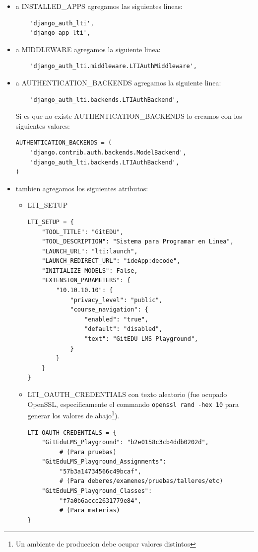 \begin{itemize}
	\item a INSTALLED\_APPS agregamos las siguientes lineas:
   		\begin{lstlisting}
    'django_auth_lti',
    'django_app_lti',
    	\end{lstlisting}
    \item a MIDDLEWARE agregamos la siguiente linea:
   		\begin{lstlisting}
    'django_auth_lti.middleware.LTIAuthMiddleware',
    	\end{lstlisting}
    \item a AUTHENTICATION\_BACKENDS agregamos la siguiente linea:
   		\begin{lstlisting}
    'django_auth_lti.backends.LTIAuthBackend',
    	\end{lstlisting}
        Si es que no existe AUTHENTICATION\_BACKENDS lo creamos con los siguientes valores:
        \begin{lstlisting}
AUTHENTICATION_BACKENDS = (
    'django.contrib.auth.backends.ModelBackend',
    'django_auth_lti.backends.LTIAuthBackend',
)
        \end{lstlisting}
    \item tambien agregamos los siguientes atributos:
    	\begin{itemize}
    		\item LTI\_SETUP
            	\begin{lstlisting}
LTI_SETUP = {
    "TOOL_TITLE": "GitEDU",
    "TOOL_DESCRIPTION": "Sistema para Programar en Linea",
    "LAUNCH_URL": "lti:launch",
    "LAUNCH_REDIRECT_URL": "ideApp:decode",
    "INITIALIZE_MODELS": False,
    "EXTENSION_PARAMETERS": {
        "10.10.10.10": {
            "privacy_level": "public",
            "course_navigation": {
                "enabled": "true",
                "default": "disabled",
                "text": "GitEDU LMS Playground",
            }
        }
    }
}
            	\end{lstlisting}
            \item LTI\_OAUTH\_CREDENTIALS con texto aleatorio (fue ocupado OpenSSL, especificamente el commando \texttt{openssl rand -hex 10} para generar los valores de abajo\footnote{Un ambiente de produccion debe ocupar valores distintos}).
            	\begin{lstlisting}
LTI_OAUTH_CREDENTIALS = {
    "GitEduLMS_Playground": "b2e0158c3cb4ddb0202d", 
         # (Para pruebas)
    "GitEduLMS_Playground_Assignments":
         "57b3a14734566c49bcaf",
         # (Para deberes/examenes/pruebas/talleres/etc)
    "GitEduLMS_Playground_Classes":
         "f7a0b6accc2631779e84",
         # (Para materias)
}
            	\end{lstlisting}
    	\end{itemize}
\end{itemize}

